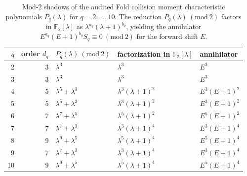 \begin{table}[H]
\centering
\scriptsize
\setlength{\tabcolsep}{5pt}
\caption{Mod-2 shadows of the audited Fold collision moment characteristic polynomials $P_q(\lambda)$ for $q=2,\dots,10$. The reduction $P_q(\lambda)\ (\mathrm{mod}\ 2)$ factors in $\mathbb{F}_2[\lambda]$ as $\lambda^{a_q}(\lambda+1)^{b_q}$, yielding the annihilator $E^{a_q}(E+1)^{b_q}S_q\equiv 0\ (\mathrm{mod}\ 2)$ for the forward shift $E$.}
\label{tab:fold_collision_charpoly_mod2_shadow_q2_10}
\begin{tabular}{r r l l l}
\toprule
$q$ & order $d_q$ & $P_q(\lambda)\ (\mathrm{mod}\ 2)$ & factorization in $\mathbb{F}_2[\lambda]$ & annihilator\\
\midrule
2 & 3 & $\lambda^{3}$ & $\lambda^{3}$ & $E^{3}$\\
3 & 3 & $\lambda^{3}$ & $\lambda^{3}$ & $E^{3}$\\
4 & 5 & $\lambda^{5} + \lambda^{3}$ & $\lambda^{3} \left(\lambda + 1\right)^{2}$ & $E^{3} \left(E + 1\right)^{2}$\\
5 & 5 & $\lambda^{5} + \lambda^{3}$ & $\lambda^{3} \left(\lambda + 1\right)^{2}$ & $E^{3} \left(E + 1\right)^{2}$\\
6 & 7 & $\lambda^{7} + \lambda^{5}$ & $\lambda^{5} \left(\lambda + 1\right)^{2}$ & $E^{5} \left(E + 1\right)^{2}$\\
7 & 7 & $\lambda^{7} + \lambda^{3}$ & $\lambda^{3} \left(\lambda + 1\right)^{4}$ & $E^{3} \left(E + 1\right)^{4}$\\
8 & 9 & $\lambda^{9} + \lambda^{5}$ & $\lambda^{5} \left(\lambda + 1\right)^{4}$ & $E^{5} \left(E + 1\right)^{4}$\\
9 & 7 & $\lambda^{7} + \lambda^{3}$ & $\lambda^{3} \left(\lambda + 1\right)^{4}$ & $E^{3} \left(E + 1\right)^{4}$\\
10 & 9 & $\lambda^{9} + \lambda^{5}$ & $\lambda^{5} \left(\lambda + 1\right)^{4}$ & $E^{5} \left(E + 1\right)^{4}$\\
\bottomrule
\end{tabular}
\end{table}

